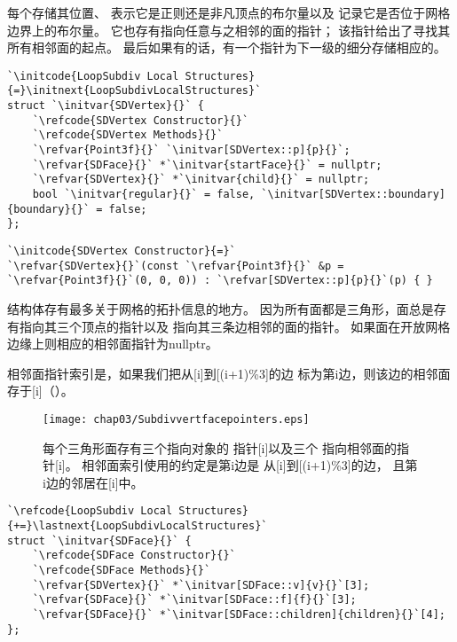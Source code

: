 每个存储其位置、
表示它是正则还是非凡顶点的布尔量以及
记录它是否位于网格边界上的布尔量。
它也存有指向任意与之相邻的面的指针；
该指针给出了寻找其所有相邻面的起点。
最后如果有的话，有一个指针为下一级的细分存储相应的。
\begin{lstlisting}
`\initcode{LoopSubdiv Local Structures}{=}\initnext{LoopSubdivLocalStructures}`
struct `\initvar{SDVertex}{}` {
    `\refcode{SDVertex Constructor}{}`
    `\refcode{SDVertex Methods}{}`
    `\refvar{Point3f}{}` `\initvar[SDVertex::p]{p}{}`;
    `\refvar{SDFace}{}` *`\initvar{startFace}{}` = nullptr;
    `\refvar{SDVertex}{}` *`\initvar{child}{}` = nullptr;
    bool `\initvar{regular}{}` = false, `\initvar[SDVertex::boundary]{boundary}{}` = false;
};
\end{lstlisting}
\begin{lstlisting}
`\initcode{SDVertex Constructor}{=}`
`\refvar{SDVertex}{}`(const `\refvar{Point3f}{}` &p = `\refvar{Point3f}{}`(0, 0, 0)) : `\refvar[SDVertex::p]{p}{}`(p) { }
\end{lstlisting}

结构体存有最多关于网格的拓扑信息的地方。
因为所有面都是三角形，面总是存有指向其三个顶点的指针以及
指向其三条边相邻的面的指针。
如果面在开放网格边缘上则相应的相邻面指针为{\ttfamily nullptr}。

相邻面指针索引是，如果我们把从{\ttfamily{}[i]}到{\ttfamily{}[(i+1)\%3]}的边
标为第{\ttfamily i}边，则该边的相邻面存于{\ttfamily{}[i]}（）。
\begin{figure}[htbp]
    \centering\texttt{[image: chap03/Subdivvertfacepointers.eps]}
    \caption{每个三角形面存有三个指向\protect{}对象的
    指针{\ttfamily\protect{}[i]}以及三个
    指向相邻面的指针{\ttfamily\protect{}[i]}。
    相邻面索引使用的约定是第{\ttfamily i}边是
    从{\ttfamily\protect{}[i]}到{\ttfamily\protect{}[(i+1)\%3]}的边，
    且第{\ttfamily i}边的邻居在{\ttfamily\protect{}[i]}中。}
    \label{fig:3.27}
\end{figure}

\begin{lstlisting}
`\refcode{LoopSubdiv Local Structures}{+=}\lastnext{LoopSubdivLocalStructures}`
struct `\initvar{SDFace}{}` {
    `\refcode{SDFace Constructor}{}`
    `\refcode{SDFace Methods}{}`
    `\refvar{SDVertex}{}` *`\initvar[SDFace::v]{v}{}`[3];
    `\refvar{SDFace}{}` *`\initvar[SDFace::f]{f}{}`[3];
    `\refvar{SDFace}{}` *`\initvar[SDFace::children]{children}{}`[4];
};
\end{lstlisting}

